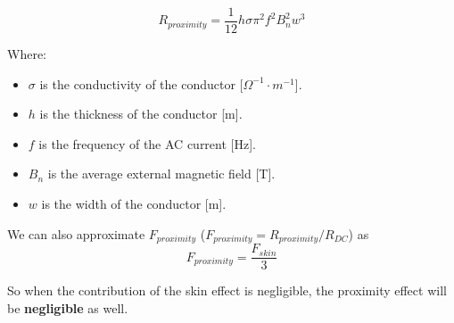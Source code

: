 \begin{itemize}
\begin{samepage}
        \begin{equation*}
            R_{proximity} = \frac{1}{12} h \sigma \pi^2 f^2 B_n^2 w^3
        \end{equation*}
        \nopagebreak
        
        Where:
        \begin{itemize}
            \item \( \sigma \) is the conductivity of the conductor [\(\Omega^{-1} \cdot m^{-1}\)].
            \item \( h \) is the thickness of the conductor [m].
            \item \( f \) is the frequency of the AC current [Hz].
            \item \( B_n \) is the average external magnetic field [T].
            \item \( w \) is the width of the conductor [m].
        \end{itemize}
    \end{samepage}

    We can also approximate $F_{proximity}$ ($F_{proximity} = R_{proximity}/R_{DC}$) as
    \begin{equation*}
        F_{proximity} = \frac{F_{skin}}{3}
    \end{equation*}

    So when the contribution of the skin effect is negligible, the proximity effect will be \textbf{negligible} as well.

\end{itemize}





